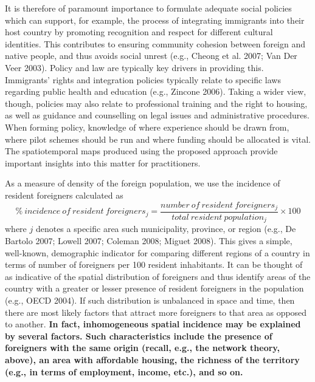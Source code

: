 \documentclass[10pt] {article}
\newcommand{\beq}{\begin{equation}}
\newcommand{\eeq}{\end{equation}}
\theoremstyle{definition}
\theoremstyle{plain}
\begin{document}
It is therefore of paramount importance to formulate adequate social policies which can support, for example, the process of integrating immigrants into their host country by promoting recognition and respect for different cultural identities. This contributes to ensuring community cohesion between foreign and native people, and thus avoids social unrest (e.g., Cheong et al. 2007; Van Der Veer 2003). Policy and law are typically key drivers in providing this. Immigrants' rights and integration policies typically relate to specific laws regarding public health and education (e.g., Zincone 2006). Taking a wider view, though, policies may also relate to professional training and the right to housing, as well as guidance and counselling on legal issues and administrative procedures. When forming policy, knowledge of where experience should be drawn from, where pilot schemes should be run and where funding should be allocated is vital. The spatiotemporal maps produced using the proposed approach provide important insights into this matter for practitioners.


As a measure of density of the foreign population, we use the incidence of resident foreigners calculated as
\beq
\% \ incidence \ of \ resident \ foreigners_j  = \frac{number \ of \ resident \ foreigners_j}{total \ resident \ population_j} \times 100
\label{first.d1}
\eeq
where $j$ denotes a specific area such municipality, province, or region (e.g., De Bartolo 2007; Lowell 2007; Coleman 2008; Miguet 2008). This gives a simple, well-known, demographic indicator for comparing different regions of a country in terms of number of foreigners per 100 resident inhabitants. It can be thought of as indicative of the spatial distribution of foreigners and thus identify areas of the country with a greater or lesser presence of resident foreigners in the population (e.g., OECD 2004). If such distribution is unbalanced in space and time, then there are most likely factors that attract more foreigners to that area as opposed to another. \textbf{In fact, inhomogeneous spatial incidence may be explained by several factors. Such characteristics include the presence of foreigners with the same origin (recall, e.g., the network theory, above), an area with affordable housing, the richness of the territory (e.g., in terms of employment, income, etc.), and so on.}
\end{document}
